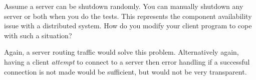 \question Assume a server can be shutdown randomly. 
You can manually shutdown any server or both when you do the tests. 
This represents the component availability issue with a distributed system.
How do you modify your client program to cope with such a situation?
\begin{solution}
    Again, a server routing traffic would solve this problem.
    Alternatively again, having a client \emph{attempt} to connect to a server
    then error handling if a successful connection is not made would be
    sufficient, but would not be very transparent.
\end{solution}